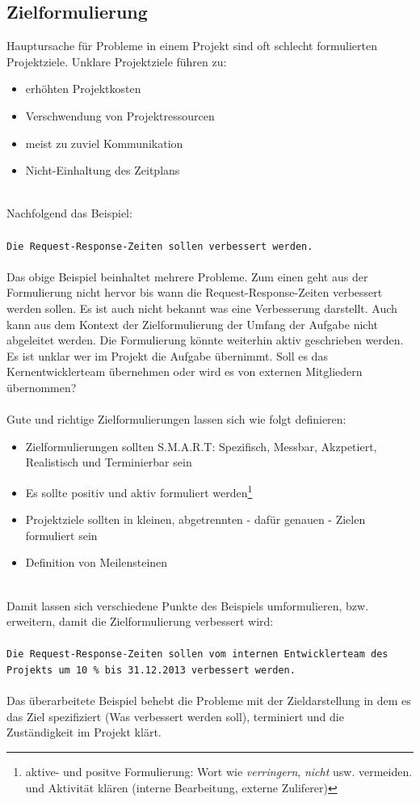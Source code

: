 \documentclass[12pt]{scrartcl}
\begin{document}
\subsection{Zielformulierung}
Hauptursache für Probleme in einem Projekt sind oft schlecht formulierten Projektziele. Unklare Projektziele führen zu:
\begin{itemize}
    \item{erhöhten Projektkosten}
    \item{Verschwendung von Projektressourcen}
    \item{meist zu zuviel Kommunikation}
    \item{Nicht-Einhaltung des Zeitplans}
\end{itemize}
\ \\
Nachfolgend das Beispiel: \\ 
\\
\texttt{Die Request-Response-Zeiten sollen verbessert werden.}\\
\\
Das obige Beispiel beinhaltet mehrere Probleme. Zum einen geht aus der Formulierung nicht hervor bis wann die Request-Response-Zeiten verbessert werden sollen. Es ist auch nicht bekannt was eine Verbesserung darstellt. Auch kann aus dem Kontext der Zielformulierung der Umfang der Aufgabe nicht abgeleitet werden. Die Formulierung könnte weiterhin aktiv geschrieben werden. Es ist unklar wer im Projekt die Aufgabe übernimmt. Soll es das Kernentwicklerteam übernehmen oder wird es von externen Mitgliedern übernommen?\\
\\
Gute und richtige Zielformulierungen lassen sich wie folgt definieren: 
\begin{itemize}
    \item{Zielformulierungen sollten S.M.A.R.T: Spezifisch, Messbar, Akzpetiert, Realistisch und Terminierbar sein}
    \item{Es sollte positiv und aktiv formuliert werden\footnote{aktive- und positve Formulierung: Wort wie \textit{verringern}, \textit{nicht} usw. vermeiden. und Aktivität klären (interne Bearbeitung, externe Zuliferer)}}
    \item{Projektziele sollten in kleinen, abgetrennten - dafür genauen - Zielen formuliert sein}
    \item{Definition von Meilensteinen}
\end{itemize}
\ \\
Damit lassen sich verschiedene Punkte des Beispiels umformulieren, bzw. erweitern, damit die Zielformulierung verbessert wird:\\
\\
\texttt{Die Request-Response-Zeiten sollen vom internen Entwicklerteam des\\
Projekts um 10 \% bis 31.12.2013 verbessert werden.} \\
\\
Das überarbeitete Beispiel behebt die Probleme mit der Zieldarstellung in dem es das Ziel spezifiziert (Was verbessert werden soll), terminiert und die Zuständigkeit im Projekt klärt.
\end{document}
